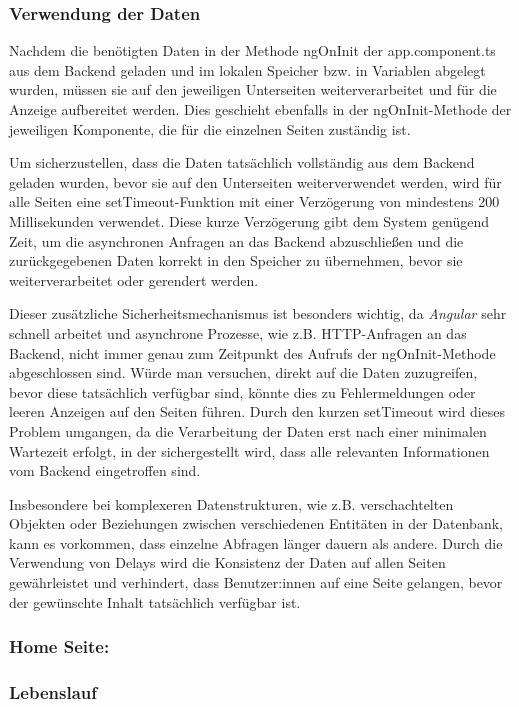 \subsubsection{Verwendung der Daten}

Nachdem die benötigten Daten in der Methode ngOnInit der app.component.ts aus dem Backend geladen und im lokalen Speicher bzw. in Variablen abgelegt wurden, müssen sie auf den jeweiligen Unterseiten weiterverarbeitet und für die Anzeige aufbereitet werden. Dies geschieht ebenfalls in der ngOnInit-Methode der jeweiligen Komponente, die für die einzelnen Seiten zuständig ist.

Um sicherzustellen, dass die Daten tatsächlich vollständig aus dem Backend geladen wurden, bevor sie auf den Unterseiten weiterverwendet werden, wird für alle Seiten eine setTimeout-Funktion mit einer Verzögerung von mindestens 200 Millisekunden verwendet. Diese kurze Verzögerung gibt dem System genügend Zeit, um die asynchronen Anfragen an das Backend abzuschließen und die zurückgegebenen Daten korrekt in den Speicher zu übernehmen, bevor sie weiterverarbeitet oder gerendert werden.

Dieser zusätzliche Sicherheitsmechanismus ist besonders wichtig, da \textit{Angular} sehr schnell arbeitet und asynchrone Prozesse, wie z.B. HTTP-Anfragen an das Backend, nicht immer genau zum Zeitpunkt des Aufrufs der ngOnInit-Methode abgeschlossen sind. Würde man versuchen, direkt auf die Daten zuzugreifen, bevor diese tatsächlich verfügbar sind, könnte dies zu Fehlermeldungen oder leeren Anzeigen auf den Seiten führen. Durch den kurzen setTimeout wird dieses Problem umgangen, da die Verarbeitung der Daten erst nach einer minimalen Wartezeit erfolgt, in der sichergestellt wird, dass alle relevanten Informationen vom Backend eingetroffen sind.

Insbesondere bei komplexeren Datenstrukturen, wie z.B. verschachtelten Objekten oder Beziehungen zwischen verschiedenen Entitäten in der Datenbank, kann es vorkommen, dass einzelne Abfragen länger dauern als andere. Durch die Verwendung von Delays wird die Konsistenz der Daten auf allen Seiten gewährleistet und verhindert, dass Benutzer:innen auf eine Seite gelangen, bevor der gewünschte Inhalt tatsächlich verfügbar ist.

\subsubsection{Home Seite:}

\subsubsection{Lebenslauf}

